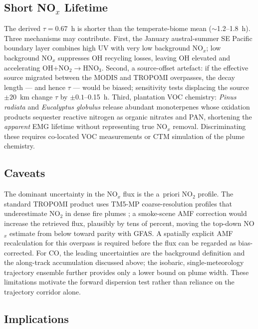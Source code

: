 \documentclass[draft]{agujournal2019}
\newcommand{\NOx}{NO$_x$}
\newcommand{\NOtwo}{NO$_2$}
\begin{document}
\subsection{Short \NOx{} Lifetime}
\label{sec:tau}

The derived $\tau = 0.67$~h is shorter than the \citet{Jin2021} temperate-biome mean ($\sim$1.2--1.8~h). Three mechanisms may contribute. First, the January austral-summer SE Pacific boundary layer combines high UV with very low background \NOx{}; low background \NOx{} suppresses OH recycling losses, leaving OH elevated and accelerating OH$+$\NOtwo{}$\rightarrow$HNO$_3$. Second, a source-offset artefact: if the effective source migrated between the MODIS and TROPOMI overpasses, the decay length --- and hence $\tau$ --- would be biased; sensitivity tests displacing the source $\pm 20$~km change $\tau$ by $\pm 0.1$--0.15~h. Third, plantation VOC chemistry: \textit{Pinus radiata} and \textit{Eucalyptus globulus} release abundant monoterpenes whose oxidation products sequester reactive nitrogen as organic nitrates and PAN, shortening the \emph{apparent} EMG lifetime without representing true \NOx{} removal. Discriminating these requires co-located VOC measurements or CTM simulation of the plume chemistry.

\subsection{Caveats}
\label{sec:caveats}

The dominant uncertainty in the \NOx{} flux is the a~priori \NOtwo{} profile. The standard TROPOMI product uses TM5-MP coarse-resolution profiles that underestimate \NOtwo{} in dense fire plumes \citep{Lorente2017, Bousserez2014}; a smoke-scene AMF correction \citep{Jin2021} would increase the retrieved flux, plausibly by tens of percent, moving the top-down \NOx{} estimate from below toward parity with GFAS. A spatially explicit AMF recalculation for this overpass is required before the flux can be regarded as bias-corrected. For CO, the leading uncertainties are the background definition and the along-track accumulation discussed above; the isobaric, single-meteorology trajectory ensemble further provides only a lower bound on plume width. These limitations motivate the forward dispersion test rather than reliance on the trajectory corridor alone.

\subsection{Implications}
\label{sec:implications}
\end{document}
